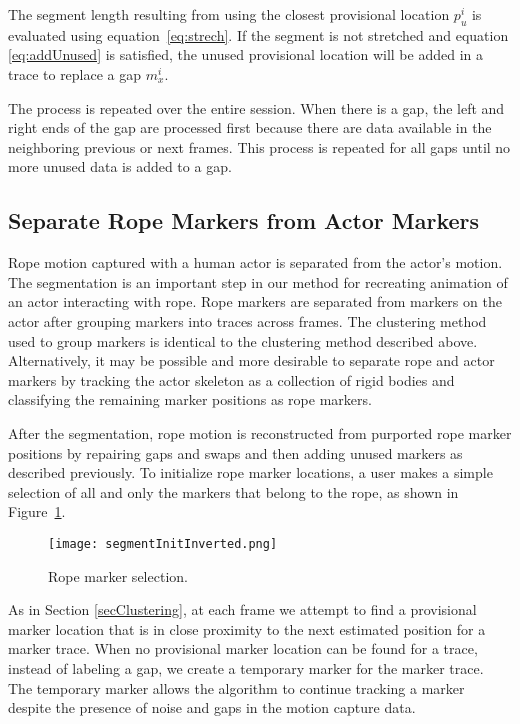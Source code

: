 The segment length resulting from using the closest provisional location $p_u^i$ is evaluated using equation~\ref{eq:strech}. If the segment is not stretched and equation \ref{eq:addUnused} is satisfied, the unused provisional location will be added in a trace to replace a gap $m_x^i$.

The process is repeated over the entire session. When there is a gap, the left and right ends of the gap are processed first because there are data available in the neighboring previous or next frames. This process is repeated for all gaps until no more unused data is added to a gap.

\subsection{Separate Rope Markers from Actor Markers}
\label{segmentation}

Rope motion captured with a human actor is separated from the actor's motion.  The segmentation is an important step in our method for recreating animation of an actor interacting with rope.  Rope markers are separated from markers on the actor after grouping markers into traces across frames.  The clustering method used to group markers is identical to the clustering method described above.   Alternatively, it may be possible and more desirable to separate rope and actor markers by tracking the actor skeleton as a collection of rigid bodies and classifying the remaining marker positions as rope markers.  

After the segmentation, rope motion is reconstructed from purported rope marker positions by repairing gaps and swaps and then adding unused markers as described previously.  To initialize rope marker locations, a user makes a simple selection of all and only the markers that belong to the rope, as shown in Figure~\ref{fig:SegInit}. 

\begin{figure}[tb]
\center
\texttt{[image: segmentInitInverted.png]}
\caption{Rope marker selection.}
\label{fig:SegInit} 
\end{figure}

As in Section \ref{secClustering}, at each frame we attempt to find a provisional marker location that is in close proximity to the next estimated position for a marker trace. When no provisional marker location can be found for a trace, instead of labeling a gap, we create a temporary marker for the marker trace. The temporary marker allows the algorithm to continue tracking a marker despite the presence of noise and gaps in the motion capture data.

